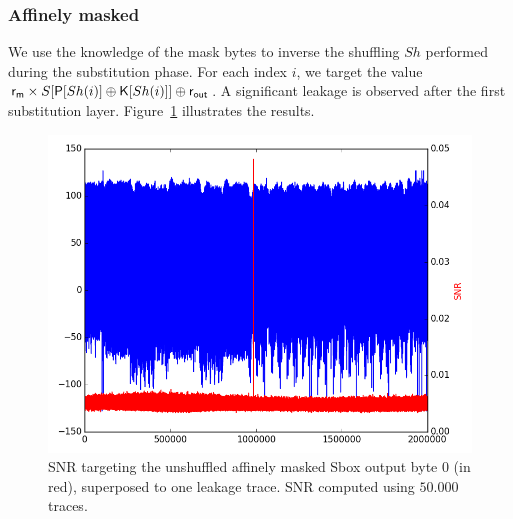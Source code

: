 \subsubsection{Affinely masked}
We use the knowledge of the mask bytes to inverse the shuffling $Sh$ performed during the substitution phase. For each index $i$, we target the value $\mathsf{r_m} \times S[\mathsf{P}[Sh(i)]\oplus \mathsf{K}[Sh(i)]] \oplus \mathsf{r_{out}}$. A significant leakage is observed after the first substitution layer. %
Figure~\ref{fig:SNR_unshuffledaS0+b} illustrates the results.
\begin{figure}[H]
	\centering 
	\includegraphics[scale=0.35]{figures/2Mpts/SNR_unshuffled_aS+b0_50ktraces.png}
	\caption{SNR targeting the unshuffled affinely masked Sbox output byte 0 (in red), superposed to one leakage trace. SNR computed using $50.000$ traces.}
	\label{fig:SNR_unshuffledaS0+b}
\end{figure}


